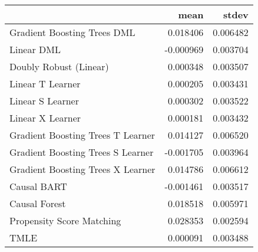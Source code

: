 \begin{tabular}{lrr}
\toprule
{} &      mean &     stdev \\
\midrule
Gradient Boosting Trees DML       &  0.018406 &  0.006482 \\
Linear DML                        & -0.000969 &  0.003704 \\
Doubly Robust (Linear)            &  0.000348 &  0.003507 \\
Linear T Learner                  &  0.000205 &  0.003431 \\
Linear S Learner                  &  0.000302 &  0.003522 \\
Linear X Learner                  &  0.000181 &  0.003432 \\
Gradient Boosting Trees T Learner &  0.014127 &  0.006520 \\
Gradient Boosting Trees S Learner & -0.001705 &  0.003964 \\
Gradient Boosting Trees X Learner &  0.014786 &  0.006612 \\
Causal BART                       & -0.001461 &  0.003517 \\
Causal Forest                     &  0.018518 &  0.005971 \\
Propensity Score Matching         &  0.028353 &  0.002594 \\
TMLE                              &  0.000091 &  0.003488 \\
\bottomrule
\end{tabular}
